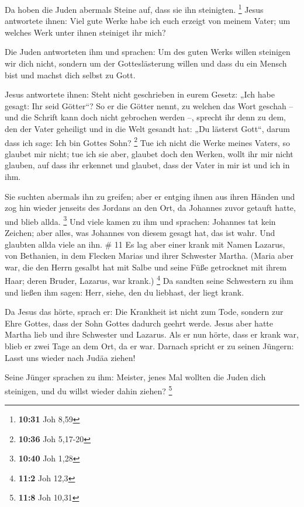  Da hoben die Juden abermals Steine auf, dass sie ihn
steinigten. \footnote{\textbf{10:31} Joh 8,59}  Jesus
antwortete ihnen: Viel gute Werke habe ich euch erzeigt von meinem
Vater; um welches Werk unter ihnen steiniget ihr mich?

 Die Juden antworteten ihm und sprachen: Um des guten Werks
willen steinigen wir dich nicht, sondern um der Gotteslästerung willen
und dass du ein Mensch bist und machst dich selbst zu Gott.

 Jesus antwortete ihnen: Steht nicht geschrieben in eurem
Gesetz: „Ich habe gesagt: Ihr seid Götter``?  So er die
Götter nennt, zu welchen das Wort geschah -- und die Schrift kann doch
nicht gebrochen werden --,  sprecht ihr denn zu dem, den
der Vater geheiligt und in die Welt gesandt hat: „Du lästerst Gott``,
darum dass ich sage: Ich bin Gottes Sohn? \footnote{\textbf{10:36} Joh
  5,17-20}  Tue ich nicht die Werke meines Vaters, so
glaubet mir nicht;  tue ich sie aber, glaubet doch den
Werken, wollt ihr mir nicht glauben, auf dass ihr erkennet und glaubet,
dass der Vater in mir ist und ich in ihm.

 Sie suchten abermals ihn zu greifen; aber er entging ihnen
aus ihren Händen  und zog hin wieder jenseits des Jordans
an den Ort, da Johannes zuvor getauft hatte, und blieb allda.
\footnote{\textbf{10:40} Joh 1,28}  Und viele kamen zu ihm
und sprachen: Johannes tat kein Zeichen; aber alles, was Johannes von
diesem gesagt hat, das ist wahr.  Und glaubten allda viele
an ihn. \# 11  Es lag aber einer krank mit Namen Lazarus,
von Bethanien, in dem Flecken Marias und ihrer Schwester Martha.
 (Maria aber war, die den Herrn gesalbt hat mit Salbe und
seine Füße getrocknet mit ihrem Haar; deren Bruder, Lazarus, war krank.)
\footnote{\textbf{11:2} Joh 12,3}  Da sandten seine
Schwestern zu ihm und ließen ihm sagen: Herr, siehe, den du liebhast,
der liegt krank.

 Da Jesus das hörte, sprach er: Die Krankheit ist nicht zum
Tode, sondern zur Ehre Gottes, dass der Sohn Gottes dadurch geehrt
werde.  Jesus aber hatte Martha lieb und ihre Schwester und
Lazarus.  Als er nun hörte, dass er krank war, blieb er zwei
Tage an dem Ort, da er war.  Darnach spricht er zu seinen
Jüngern: Lasst uns wieder nach Judäa ziehen!

 Seine Jünger sprachen zu ihm: Meister, jenes Mal wollten
die Juden dich steinigen, und du willst wieder dahin ziehen? \footnote{\textbf{11:8}
  Joh 10,31}

